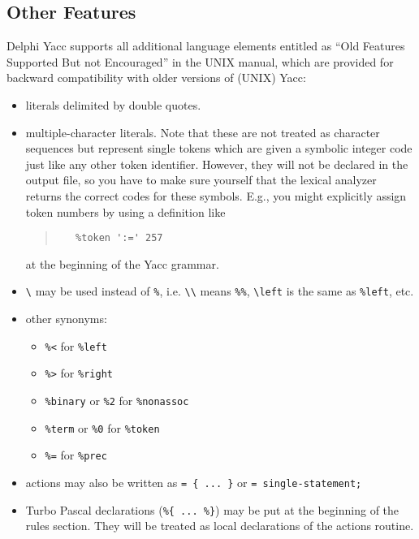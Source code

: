 \documentclass{article}
\begin{document}
\subsection{Other Features}

Delphi Yacc supports all additional language elements entitled as ``Old Features
Supported But not Encouraged'' in the UNIX manual, which are provided for
backward compatibility with older versions of (UNIX) Yacc:

\begin{itemize}
   \item
      literals delimited by double quotes.
   \item
      multiple-character literals. Note that these are not treated as
      character sequences but represent single tokens which are given a
      symbolic integer code just like any other token identifier. However,
      they will not be declared in the output file, so you have to make sure
      yourself that the lexical analyzer returns the correct codes for these
      symbols. E.g., you might explicitly assign token numbers by using a
      definition like
      \begin{quote}\begin{verbatim}
   %token ':=' 257
      \end{verbatim}\end{quote}
      at the beginning of the Yacc grammar.
   \item
      \verb"\" may be used instead of \verb"%", i.e. \verb"\\" means
      \verb"%%", \verb"\left" is the same as \verb"%left", etc.
   \item
      other synonyms:
      \begin{itemize}
         \item \verb"%<"                    for \verb"%left"
         \item \verb"%>"                    for \verb"%right"
         \item \verb"%binary" or \verb"%2"  for \verb"%nonassoc"
         \item \verb"%term" or \verb"%0"    for \verb"%token"
         \item \verb"%="                    for \verb"%prec"
      \end{itemize}
   \item
      actions may also be written as \verb"= { ... }" or
      \verb"= single-statement;"
   \item
      Turbo Pascal declarations (\verb"%{ ... %}") may be put at the
      beginning of the rules section. They will be treated as local
      declarations of the actions routine.
\end{itemize}
\end{document}

